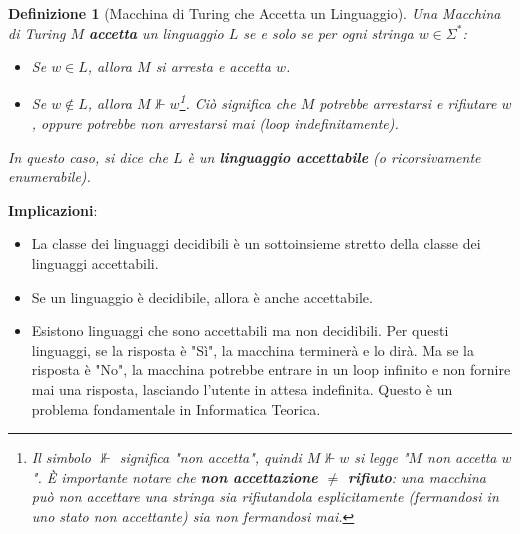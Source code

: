 \documentclass[a4paper]{article}
\newtheorem{definition}{Definizione}
\begin{document}
\begin{definition}[Macchina di Turing che Accetta un Linguaggio]
    Una Macchina di Turing $M$ \textbf{accetta} un linguaggio $L$ se e solo se per ogni stringa $w \in \Sigma^*$:
    \begin{itemize}
        \item Se $w \in L$, allora $M$ si arresta e accetta $w$.
        \item Se $w \notin L$, allora $M \nVdash w$\footnote{Il simbolo $\nVdash$ significa "non accetta", quindi $M \nVdash w$ si legge "$M$ non accetta $w$". È importante notare che \textbf{non accettazione $\neq$ rifiuto}: una macchina può non accettare una stringa sia rifiutandola esplicitamente (fermandosi in uno stato non accettante) sia non fermandosi mai.}. Ciò significa che $M$ potrebbe arrestarsi e rifiutare $w$, \emph{oppure potrebbe non arrestarsi mai (loop indefinitamente)}.
    \end{itemize}
    In questo caso, si dice che $L$ è un \textbf{linguaggio accettabile} (o ricorsivamente enumerabile).
\end{definition}

\textbf{Implicazioni}:
\begin{itemize}
    \item La classe dei linguaggi decidibili è un sottoinsieme stretto della classe dei linguaggi accettabili.
    \item Se un linguaggio è decidibile, allora è anche accettabile.
    \item Esistono linguaggi che sono accettabili ma non decidibili. Per questi linguaggi, se la risposta è "Sì", la macchina terminerà e lo dirà. Ma se la risposta è "No", la macchina potrebbe entrare in un loop infinito e non fornire mai una risposta, lasciando l'utente in attesa indefinita. Questo è un problema fondamentale in Informatica Teorica.
\end{itemize}
\end{document}
